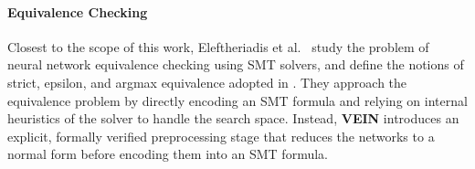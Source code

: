 \paragraph{Equivalence Checking}
Closest to the scope of this work, Eleftheriadis et al.~\cite{eleftheriadis2022equivalence} study
the problem of neural network equivalence checking using SMT solvers, and define the notions of
strict, epsilon, and argmax equivalence adopted in \textbf{}. They approach the
equivalence problem by directly encoding an SMT formula and relying on internal heuristics of the
solver to handle the search space. Instead, \textbf{VEIN} introduces an explicit, formally verified
preprocessing stage that reduces the networks to a normal form before encoding them into an SMT
formula.
